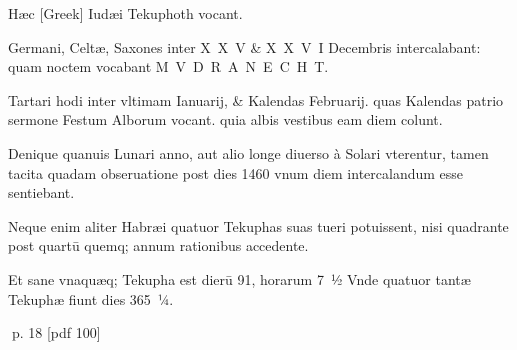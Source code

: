 \begin{parnumbers}
Hæc \textgreek{[Greek]} Iudæi Tekuphoth vocant.

Germani, Celtæ, Saxones inter X X V \& X X V I Decembris intercalabant: quam noctem vocabant M V D R A N E C H T.

Tartari hodi inter vltimam Ianuarij, \& Kalendas Februarij. quas Kalendas patrio sermone Festum Alborum vocant. quia albis vestibus eam diem colunt.

Denique quanuis  Lunari anno, aut alio longe diuerso à Solari vterentur, tamen tacita quadam obseruatione post dies 1460 vnum diem intercalandum esse sentiebant.

Neque enim aliter Habræi quatuor Tekuphas suas tueri potuissent, nisi quadrante post quartū quemq; annum rationibus accedente.

Et sane vnaquæq; Tekupha est dierū 91, horarum 7 ½ Vnde quatuor tantæ Tekuphæ fiunt dies 365 ¼.

\end{parnumbers}
\clearpage
p. 18 [pdf 100]

